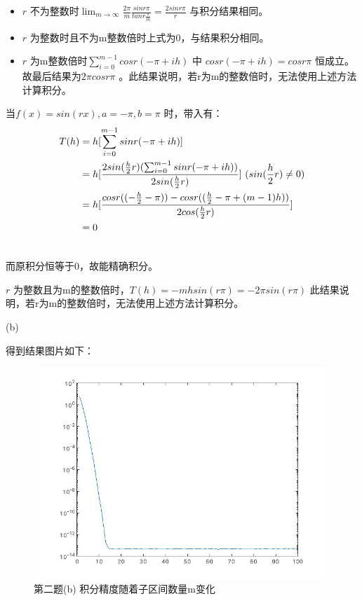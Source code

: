 \documentclass[12pt,a4paper,utf8]{ctexart}
\begin{document}
\begin{enumerate}
\begin{itemize}
\item $ r $ 不为整数时$ \lim_{m \to \infty}  \frac{2\pi }{m} \frac{sinr\pi }{tanr\frac{\pi}{m} } =\frac{2sinr\pi}{r}  $ 
与积分结果相同。

\item $ r $ 为整数时且不为m整数倍时上式为0，与结果积分相同。

\item $ r $ 为m整数倍时$ \sum_{i=0}^{m-1}cosr(-\pi +ih) $ 中 $ cosr(-\pi +ih)=cosr\pi $ 恒成立。
故最后结果为$ 2\pi cosr\pi $ 。此结果说明，若r为m的整数倍时，无法使用上述方法计算积分。
\end{itemize}

当$ f(x)=sin(rx),a=-\pi ,b=\pi $ 时，带入有：
\begin{equation}
    \begin{split}
       T(h) & = h[\sum_{i=0}^{m-1}sinr(-\pi +ih)] \\
            & = h[\frac{2sin(\frac{h}{2} r)(\sum_{i=0}^{m-1}sinr(-\pi +ih))}{2sin(\frac{h}{2} r)} ] \ (sin(\frac{h}{2} r)\neq 0) \\
            & = h[\frac{cosr((-\frac{h}{2} -\pi) ) - cosr((\frac{h}{2} -\pi +(m-1)h) )}{2cos(\frac{h}{2} r)} ]\\
            & = 0\\
          \notag
       \end{split}
\end{equation}

而原积分恒等于0，故能精确积分。

$ r $ 为整数且为m的整数倍时，$ T(h)=-mhsin(r\pi)=-2\pi sin(r\pi) $ 
此结果说明，若r为m的整数倍时，无法使用上述方法计算积分。

(b)

得到结果图片如下：

\begin{figure}[H]
  \centering
  \includegraphics[width=15cm,height=8cm]{ex2b.jpg}
  \caption{第二题(b) 积分精度随着子区间数量m变化}
\end{figure}



\end{enumerate}
\end{document}
